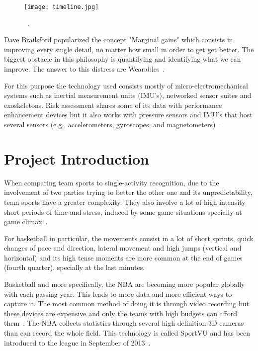 \begin{figure}[htbp]
    \centering
    \texttt{[image: timeline.jpg]}
    \caption{~\cite[Timeline of sensing technology intertwined with basketball sport]{perspective}.}
    \label{fig:sensorTimeline}
\end{figure}

Dave Brailsford popularized the concept "Marginal gains" which consists in improving every single detail, no matter how small in order to get get better. The biggest obstacle in 
this philosophy is quantifying and identifying what we can improve. The answer to this distress are Wearables~\cite{impactWearable}.

For this purpose the technology used consists mostly of micro-electromechanical systems such as inertial measurement units (IMU's), networked sensor suites and exoskeletons. 
Risk assessment shares some of its data with performance enhancement devices but it also works with 
pressure sensors and IMU's that host several sensors (e.g., accelerometers, gyroscopes, and magnetometers)~\cite{biomechanicalPerfomance}. 

\section{Project Introduction}
\label{sec:introduction}

When comparing team sports to single-activity recognition, due to the involvement of two parties trying to better the other one and its unpredictability, team sports have a greater complexity. 
They also involve a lot of high intensity short periods of time and stress, induced by some game situations specially at game climax~\cite{performanceAndTactics}. 

For basketball in particular, the movements consist in a lot of short sprints, quick changes of pace and direction, lateral movement and high jumps (vertical and horizontal) and its high tense moments are more common 
at the end of games (fourth quarter), specially at the last minutes.

Basketball and more specifically, the NBA are becoming more popular globally with each passing year. This leads to more data and more efficient ways to capture it. The most common method 
of doing it is through video recording but these devices are expensive and only the teams with high budgets can afford them~\cite{basketballMotions}. 
The NBA collects statistics through several high definition 3D cameras than can record the whole field. This technology is called SportVU and has been introduced to the league in September of 2013~\cite{basketballFootwork}.

